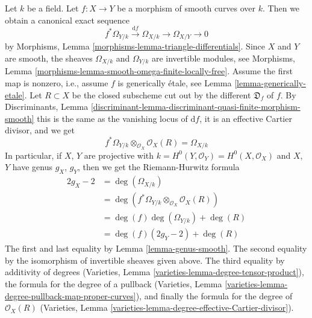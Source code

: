 \noindent
Let $k$ be a field. Let $f : X \to Y$ be a morphism of smooth curves over $k$.
Then we obtain a canonical exact sequence
$$
f^*\Omega_{Y/k} \xrightarrow{\text{d}f} \Omega_{X/k}
\longrightarrow \Omega_{X/Y} \longrightarrow 0
$$
by Morphisms, Lemma \ref{morphisms-lemma-triangle-differentials}.
Since $X$ and $Y$ are smooth, the sheaves $\Omega_{X/k}$ and
$\Omega_{Y/k}$ are invertible modules, see
Morphisms, Lemma \ref{morphisms-lemma-smooth-omega-finite-locally-free}.
Assume the first map is nonzero, i.e., assume $f$ is generically
\'etale, see Lemma \ref{lemma-generically-etale}. Let $R \subset X$
be the closed subscheme cut out by the different $\mathfrak{D}_f$ of $f$.
By Discriminants, Lemma
\ref{discriminant-lemma-discriminant-quasi-finite-morphism-smooth}
this is the same as the vanishing locus of $\text{d}f$, it is
an effective Cartier divisor, and we get
$$
f^*\Omega_{Y/k} \otimes_{\mathcal{O}_X} \mathcal{O}_X(R) = \Omega_{X/k}
$$
In particular, if $X$, $Y$ are projective with
$k = H^0(Y, \mathcal{O}_Y) = H^0(X, \mathcal{O}_X)$
and $X$, $Y$ have genus $g_X$, $g_Y$, then we get the
Riemann-Hurwitz formula
\begin{align*}
2g_X - 2 & =
\deg(\Omega_{X/k}) \\
& =
\deg(f^*\Omega_{Y/k} \otimes_{\mathcal{O}_X} \mathcal{O}_X(R)) \\
& =
\deg(f) \deg(\Omega_{Y/k}) + \deg(R) \\
& =
\deg(f) (2g_Y - 2) + \deg(R)
\end{align*}
The first and last equality by Lemma \ref{lemma-genus-smooth}.
The second equality by the isomorphism of invertible sheaves given above.
The third equality by additivity of degrees
(Varieties, Lemma \ref{varieties-lemma-degree-tensor-product}),
the formula for the degree of a pullback
(Varieties, Lemma \ref{varieties-lemma-degree-pullback-map-proper-curves}),
and finally the formula for the degree of $\mathcal{O}_X(R)$
(Varieties, Lemma \ref{varieties-lemma-degree-effective-Cartier-divisor}).

